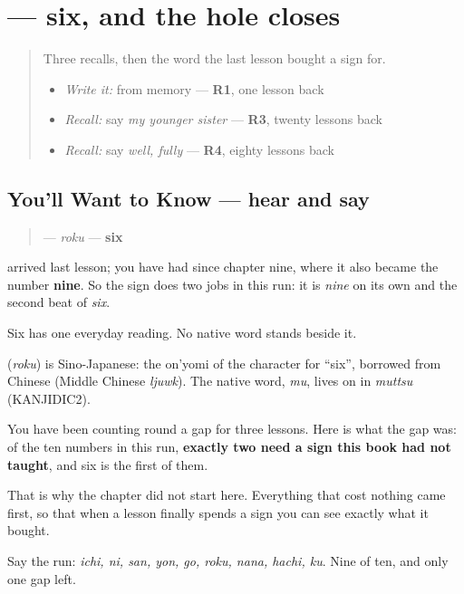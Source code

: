 \section[\texorpdfstring{\ja{ろく} (roku)}{ろく (roku)}]{ — six, and the hole closes}

\label{lesson:JA-C15-roku}



\begin{quote}
Three recalls, then the word the last lesson bought a sign for.

\begin{itemize}
\raggedright
  \item \emph{Write it:} \textbf{} from memory — \textbf{R1}, one lesson back
  \item \emph{Recall:} say \emph{my younger sister} — \textbf{R3}, twenty lessons back
  \item \emph{Recall:} say \emph{well, fully} — \textbf{R4}, eighty lessons back
\end{itemize}
\end{quote}

\subsection*{You'll Want to Know — hear and say}
\begin{quote}
\textbf{} — \emph{roku} — \textbf{six}
\end{quote}

\textbf{} arrived last lesson; \textbf{} you have had since chapter nine, where it also became the number \textbf{nine}. So the sign \textbf{} does two jobs in this run: it is \emph{nine} on its own and the second beat of \emph{six}.

Six has one everyday reading. No native word stands beside it.

\begin{cousinweb}
\textbf{} (\emph{roku}) is Sino-Japanese: the on'yomi of the character for \textquotedblleft{}six\textquotedblright{}, borrowed from Chinese (Middle Chinese \emph{ljuwk}). The native word, \emph{mu}, lives on in \emph{muttsu} (KANJIDIC2).
\end{cousinweb}

\begin{grammarlens}[title={What you've built — why six waited}]
You have been counting round a gap for three lessons. Here is what the gap was: of the ten numbers in this run, \textbf{exactly two need a sign this book had not taught}, and six is the first of them.

That is why the chapter did not start here. Everything that cost nothing came first, so that when a lesson finally spends a sign you can see exactly what it bought.

Say the run: \emph{ichi, ni, san, yon, go, roku, nana, hachi, ku}. Nine of ten, and only one gap left.
\end{grammarlens}


